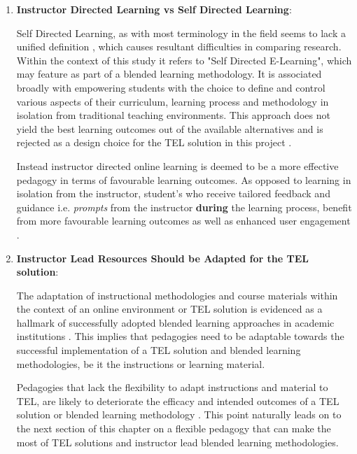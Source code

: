 \begin{enumerate}

    \newpage

    \item \textbf{Instructor Directed Learning vs Self Directed Learning}:
    
    Self Directed Learning, as with most terminology in  the field seems to lack a unified definition \cite{OShea2003,Hiemstra2006}, which causes resultant difficulties in comparing research. Within the context of this study it refers to "Self Directed E-Learning", which may feature as part of a blended learning methodology. It is associated broadly with empowering students with the choice to define and control various aspects of their curriculum, learning process and methodology in isolation \cite{Hiemstra2006,Means2009,RickReis,Team2008} from traditional teaching environments. This approach does not yield the best learning outcomes out of the available alternatives and is rejected as a design choice for the TEL solution in this project \cite{RickReis,Team2008}. 
    
    Instead instructor directed online learning is deemed to be a more effective pedagogy in terms of favourable learning outcomes. As opposed to learning in isolation from the instructor, student's who receive tailored feedback and guidance  i.e. \textit{prompts} from the instructor \textbf{during} the learning process, benefit from more favourable learning outcomes as well as enhanced user engagement \cite{RickReis,Team2008,Means2009}.


    \item \textbf{Instructor Lead Resources Should be Adapted for the TEL solution}:
    
    The adaptation of instructional methodologies and course materials within the context of an online environment or TEL solution is evidenced as a hallmark of successfully adopted blended learning approaches in academic institutions \cite{Means2009,Team2008,RickReis}. This implies that pedagogies need to be adaptable towards the successful implementation of a TEL solution and blended learning methodologies, be it the instructions or learning material.
    
    Pedagogies that lack the flexibility to adapt instructions and material to TEL, are likely to deteriorate the efficacy and intended outcomes of a TEL solution or blended learning methodology \cite{RickReis,Team2008,Means2009}. This point naturally leads on to the next section of this chapter on a flexible pedagogy that can make the most of TEL solutions and instructor lead blended learning methodologies.
\end{enumerate}


